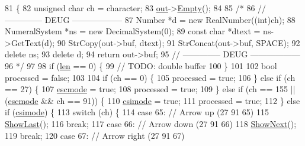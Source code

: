 \begin{DoxyCode}
81 \{
82     \textcolor{keywordtype}{unsigned} \textcolor{keywordtype}{char} ch = character;
83     \hyperlink{classAnsiConoleEngine_ad6a604fc0a0f544907513076c72434f3}{out}->\hyperlink{classCharBuffer_abe39d3fd7d8b9c8ec343af2cae7adc96}{Empty}();
84 
85     \textcolor{comment}{/*}
86 \textcolor{comment}{    // -------------- DEUG ------------------}
87 \textcolor{comment}{    Number *d = new RealNumber((int)ch);}
88 \textcolor{comment}{    NumeralSystem *ns = new DecimalSystem(0);}
89 \textcolor{comment}{    const char *dtext = ns->GetText(d);}
90 \textcolor{comment}{    StrCopy(out->buf, dtext);}
91 \textcolor{comment}{    StrConcat(out->buf, SPACE);}
92 \textcolor{comment}{    delete ns;}
93 \textcolor{comment}{    delete d;}
94 \textcolor{comment}{    return out->buf;}
95 \textcolor{comment}{    // -------------- DEUG ------------------}
96 \textcolor{comment}{    */}
97 
98     \textcolor{keywordflow}{if} (\hyperlink{classAnsiConoleEngine_ad5d65280df848947f5b2dda80dcf35c6}{len} == 0) \{
99         \textcolor{comment}{// TODO: double buffer}
100     \}
101 
102     \textcolor{keywordtype}{bool} processed = \textcolor{keyword}{false};
103 
104     \textcolor{keywordflow}{if} (ch == 0) \{
105         processed = \textcolor{keyword}{true};
106     \} \textcolor{keywordflow}{else} \textcolor{keywordflow}{if} (ch == 27) \{
107         \hyperlink{classAnsiConoleEngine_af497f5cbdca8bbc350935a90568b06e7}{escmode} = \textcolor{keyword}{true};
108         processed = \textcolor{keyword}{true};
109     \} \textcolor{keywordflow}{else} \textcolor{keywordflow}{if} (ch == 155 || (\hyperlink{classAnsiConoleEngine_af497f5cbdca8bbc350935a90568b06e7}{escmode} && ch == 91)) \{
110         \hyperlink{classAnsiConoleEngine_adf2036857a6c6de85836ee2e7b3e5d6d}{csimode} = \textcolor{keyword}{true};
111         processed = \textcolor{keyword}{true};
112     \} \textcolor{keywordflow}{else} \textcolor{keywordflow}{if} (\hyperlink{classAnsiConoleEngine_adf2036857a6c6de85836ee2e7b3e5d6d}{csimode}) \{
113         \textcolor{keywordflow}{switch} (ch) \{
114         \textcolor{keywordflow}{case} 65: \textcolor{comment}{// Arrow up (27 91 65)}
115             \hyperlink{classAnsiConoleEngine_afc441f10d1c52dba7b3ca1a5f2514e7c}{ShowLast}();
116             \textcolor{keywordflow}{break};
117         \textcolor{keywordflow}{case} 66: \textcolor{comment}{// Arrow down (27 91 66)}
118             \hyperlink{classAnsiConoleEngine_a93c3eccd6c1458e1a82bdbf202948d90}{ShowNext}();
119             \textcolor{keywordflow}{break};
120         \textcolor{keywordflow}{case} 67: \textcolor{comment}{// Arrow right (27 91 67)}

\end{DoxyCode}
